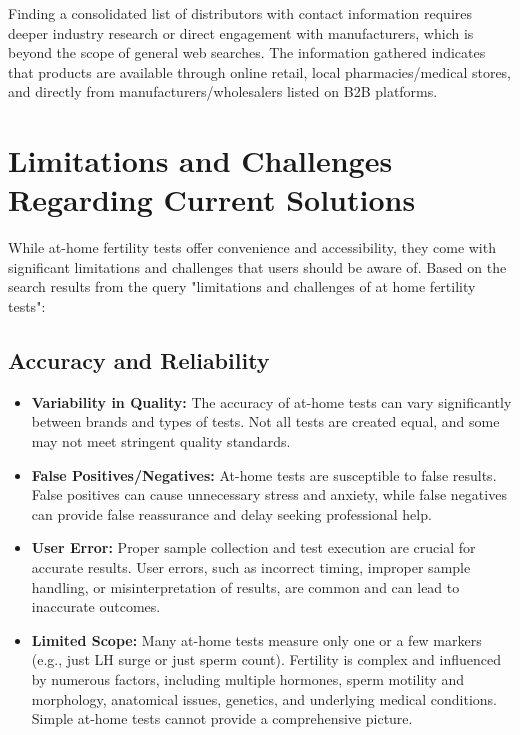 \documentclass{article}
\begin{document}
Finding a consolidated list of distributors with contact information requires deeper industry research or direct engagement with manufacturers, which is beyond the scope of general web searches. The information gathered indicates that products are available through online retail, local pharmacies/medical stores, and directly from manufacturers/wholesalers listed on B2B platforms.

\section{Limitations and Challenges Regarding Current Solutions}

While at-home fertility tests offer convenience and accessibility, they come with significant limitations and challenges that users should be aware of. Based on the search results from the query "limitations and challenges of at home fertility tests":

\subsection{Accuracy and Reliability}
\begin{itemize}
    \item \textbf{Variability in Quality:} The accuracy of at-home tests can vary significantly between brands and types of tests. Not all tests are created equal, and some may not meet stringent quality standards.
    \item \textbf{False Positives/Negatives:} At-home tests are susceptible to false results. False positives can cause unnecessary stress and anxiety, while false negatives can provide false reassurance and delay seeking professional help.
    \item \textbf{User Error:} Proper sample collection and test execution are crucial for accurate results. User errors, such as incorrect timing, improper sample handling, or misinterpretation of results, are common and can lead to inaccurate outcomes.
    \item \textbf{Limited Scope:} Many at-home tests measure only one or a few markers (e.g., just LH surge or just sperm count). Fertility is complex and influenced by numerous factors, including multiple hormones, sperm motility and morphology, anatomical issues, genetics, and underlying medical conditions. Simple at-home tests cannot provide a comprehensive picture.
\end{itemize}
\end{document}
